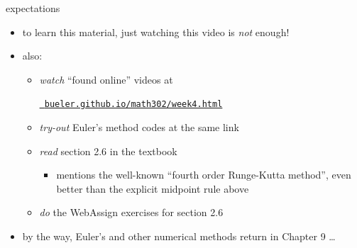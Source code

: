 \documentclass{beamer}
\begin{document}
\begin{frame}{expectations}

\begin{itemize}
\item to learn this material, just watching this video is \emph{not} enough!

\item also:
     \begin{itemize}
     \item \emph{watch} ``found online'' videos at

     \centerline{\href{https://bueler.github.io/math302/week4.html}{\tt \color{cyan} bueler.github.io/math302/week4.html}}
     \item \emph{try-out} Euler's method codes at the same link
     \item \emph{read} section 2.6 in the textbook
         \begin{itemize}
         \item mentions the well-known ``fourth order Runge-Kutta method'', even better than the explicit midpoint rule above
         \end{itemize}
     \item \emph{do} the WebAssign exercises for section 2.6
     \end{itemize}

\bigskip
\item by the way, Euler's and other numerical methods return in Chapter 9 \dots
\end{itemize}
\end{frame}
\end{document}
